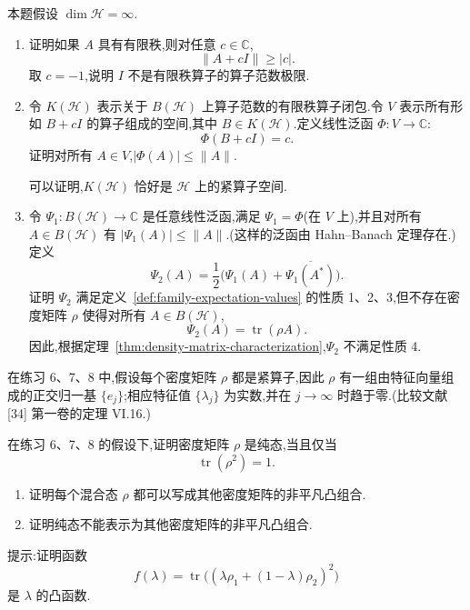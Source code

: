 \begin{exercise}[强连续性与算子范数连续性的区别]\label{ex:strong-not-norm-functional}
本题假设 $\dim\mathcal H=\infty$.
\begin{enumerate}
\item 证明如果 $A$ 具有有限秩,则对任意 $c\in\mathbb C$,
\[
 \|A+cI\|\ge|c|.
\]
取 $c=-1$,说明 $I$ 不是有限秩算子的算子范数极限.
\item 令 $K(\mathcal H)$ 表示关于 $B(\mathcal H)$ 上算子范数的有限秩算子闭包.令 $V$ 表示所有形如 $B+cI$ 的算子组成的空间,其中 $B\in K(\mathcal H)$.定义线性泛函 $\Phi:V\to\mathbb C$:
\[
 \Phi(B+cI)=c.
\]
证明对所有 $A\in V$,$|\Phi(A)|\le\|A\|$.

\begin{note}
可以证明,$K(\mathcal H)$ 恰好是 $\mathcal H$ 上的紧算子空间.
\end{note}

\item 令 $\Psi_1:B(\mathcal H)\to\mathbb C$ 是任意线性泛函,满足 $\Psi_1=\Phi$(在 $V$ 上),并且对所有 $A\in B(\mathcal H)$ 有 $|\Psi_1(A)|\le\|A\|$.(这样的泛函由 Hahn--Banach 定理存在.)定义
\[
 \Psi_2(A)=\frac12\bigl(\Psi_1(A)+\overline{\Psi_1(A^*)}\bigr).
\]
证明 $\Psi_2$ 满足定义~\ref{def:family-expectation-values} 的性质 1、2、3,但不存在密度矩阵 $\rho$ 使得对所有 $A\in B(\mathcal H)$,
\[
 \Psi_2(A)=\operatorname{tr}(\rho A).
\]
因此,根据定理~\ref{thm:density-matrix-characterization},$\Psi_2$ 不满足性质 4.
\end{enumerate}
\end{exercise}

在练习 6、7、8 中,假设每个密度矩阵 $\rho$ 都是紧算子,因此 $\rho$ 有一组由特征向量组成的正交归一基 $\{e_j\}$;相应特征值 $\{\lambda_j\}$ 为实数,并在 $j\to\infty$ 时趋于零.(比较文献 [34] 第一卷的定理 VI.16.)

\begin{exercise}[纯态的迹判据]\label{ex:pure-state-trace}
在练习 6、7、8 的假设下,证明密度矩阵 $\rho$ 是纯态,当且仅当
\[
 \operatorname{tr}(\rho^2)=1.
\]
\end{exercise}

\begin{exercise}[纯态与凸组合]\label{ex:pure-state-extreme}
\begin{enumerate}
\item 证明每个混合态 $\rho$ 都可以写成其他密度矩阵的非平凡凸组合.
\item 证明纯态不能表示为其他密度矩阵的非平凡凸组合.
\end{enumerate}
提示:证明函数
\[
 f(\lambda)=\operatorname{tr}\bigl((\lambda\rho_1+(1-\lambda)\rho_2)^2\bigr)
\]
是 $\lambda$ 的凸函数.
\end{exercise}

